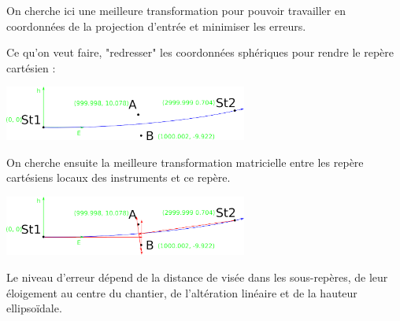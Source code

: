 \documentclass[french]{report}
\begin{document}
On cherche ici une meilleure transformation pour pouvoir travailler en coordonnées
de la projection d'entrée et minimiser les erreurs.

Ce qu'on veut faire, "redresser" les coordonnées sphériques pour rendre le repère cartésien :
\begin{center}
\includegraphics[width = 8cm]{images/ex_approx_spher_xyz_spher_redress}
\end{center}

On cherche ensuite la meilleure transformation matricielle entre les repère cartésiens locaux
des instruments et ce repère.
\begin{center}
\includegraphics[width = 8cm]{images/ex_approx_spher_xyz_spher_redress2}
\end{center}

Le niveau d'erreur dépend de la distance de visée dans les sous-repères,
de leur éloigement au centre du chantier, de l'altération linéaire et
de la hauteur ellipsoïdale.






\end{document}
